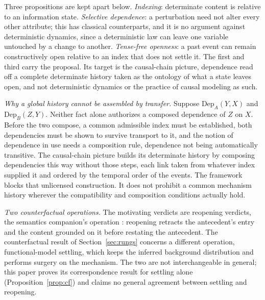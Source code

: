 \documentclass[11pt]{article}
\begin{document}
Three propositions are kept apart below. \emph{Indexing}: determinate content is relative to an information state. \emph{Selective dependence}: a perturbation need not alter every other attribute; this has classical counterparts, and it is no argument against deterministic dynamics, since a deterministic law can leave one variable untouched by a change to another. \emph{Tense-free openness}: a past event can remain constructively open relative to an index that does not settle it. The first and third carry the proposal. Its target is the causal-chain picture, dependence read off a complete determinate history taken as the ontology of what a state leaves open, and not deterministic dynamics or the practice of causal modeling as such.

\noindent\textit{Why a global history cannot be assembled by transfer.} Suppose $\mathrm{Dep}_A(Y, X)$ and $\mathrm{Dep}_B(Z, Y)$. Neither fact alone authorizes a composed dependence of $Z$ on $X$. Before the two compose, a common admissible index must be established, both dependencies must be shown to survive transport to it, and the notion of dependence in use needs a composition rule, dependence not being automatically transitive. The causal-chain picture builds its determinate history by composing dependencies this way without those steps, each link taken from whatever index supplied it and ordered by the temporal order of the events. The framework blocks that unlicensed construction. It does not prohibit a common mechanism history wherever the compatibility and composition conditions actually hold.

\noindent\textit{Two counterfactual operations.} The motivating verdicts are reopening verdicts, the semantics companion's operation \cite{AethusSemantics}: reopening retracts the antecedent's entry and the content grounded on it before restating the antecedent. The counterfactual result of Section~\ref{sec:rungs} concerns a different operation, functional-model settling, which keeps the inferred background distribution and performs surgery on the mechanism. The two are not interchangeable in general; this paper proves its correspondence result for settling alone (Proposition~\ref{prop:cf}) and claims no general agreement between settling and reopening.
\end{document}
